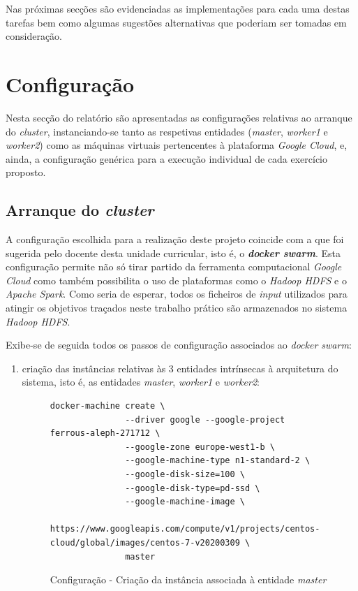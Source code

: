 \documentclass[a4paper]{report}
\begin{document}
{    Nas próximas secções são evidenciadas as implementações para cada uma destas tarefas bem como algumas sugestões alternativas que poderiam ser tomadas em consideração.

    \section{Configuração} \label{sec:Configuration}
        Nesta secção do relatório são apresentadas as configurações relativas ao arranque do \textit{cluster}, instanciando-se tanto as respetivas entidades (\textsl{master}, \textsl{worker1} e \textsl{worker2}) como as máquinas virtuais pertencentes à plataforma \textit{Google Cloud}, e, ainda, a configuração genérica para a execução individual de cada exercício proposto. 

        \subsection{Arranque do \textit{cluster}}
            A configuração escolhida para a realização deste projeto coincide com a que foi sugerida pelo docente desta unidade curricular, isto é, o \textbf{\textit{docker swarm}}.
            Esta configuração permite não só tirar partido da ferramenta computacional \textit{Google Cloud} como também possibilita o uso de plataformas como o \textit{Hadoop HDFS} e o \textit{Apache Spark}.
            Como seria de esperar, todos os ficheiros de \textit{input} utilizados para atingir os objetivos traçados neste trabalho prático são armazenados no sistema \textit{Hadoop HDFS}.
            
            Exibe-se de seguida todos os passos de configuração associados ao \textit{docker swarm}:
            \begin{enumerate}[label=\textbf{\arabic*.}]
                \item criação das instâncias relativas às 3 entidades intrínsecas à arquitetura do sistema, isto é, as entidades \textsl{master}, \textsl{worker1} e \textsl{worker2}:
                \begin{figure}[H]
                    \centering
                    \begin{verbatim}
docker-machine create \
               --driver google --google-project ferrous-aleph-271712 \
               --google-zone europe-west1-b \
               --google-machine-type n1-standard-2 \
               --google-disk-size=100 \
               --google-disk-type=pd-ssd \
               --google-machine-image \
       https://www.googleapis.com/compute/v1/projects/centos-cloud/global/images/centos-7-v20200309 \
               master
                    \end{verbatim}
                    \vspace{-5mm}
                    \caption{Configuração - Criação da instância associada à entidade \textsl{master}}
                    \label{fig:1}
                \end{figure}
                

\end{enumerate}}
\end{document}
